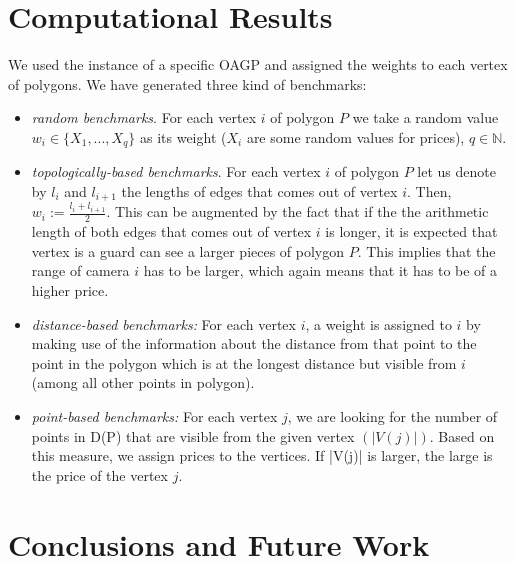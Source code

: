 \documentclass[runningheads,a4paper]{llncs}
\begin{document}
     \section{Computational Results}
       We used the instance of a specific OAGP and assigned the weights to each vertex of polygons. We have generated three kind of benchmarks:
       \begin{itemize}
       	  \item \emph{random benchmarks}. For each vertex $i$ of polygon $P$ we take a random value $w_i \in \{X_1,...,X_q\}$  as its weight ($X_i$ are some random values for prices), $q \in \mathbb{N}$.
       	  \item \emph{topologically-based benchmarks}. For each vertex $i$ of polygon $P$ let us denote by $l_i$ and $l_{i+1}$ the lengths of edges that comes out of vertex $i$. Then, $w_i := \frac{l_i + l_{i+1}}{2}$. This can be augmented by the fact that if the the arithmetic length of both edges that comes out of vertex $i$ is longer, it is expected that vertex is a guard can see a larger pieces of polygon $P$. This implies that the range of camera $i$ has to be larger, which again means that it has to be of a higher price.
       	 \item \emph{distance-based benchmarks:} For each vertex $i$, a weight is assigned to $i$ by making use of the information about the distance from that point to the point in the polygon which is at the longest distance but visible from $i$ (among all other points in polygon). 
       	 \item \emph{point-based benchmarks:} For each vertex $j$, we are looking for the number of points in D(P) that are visible from the given vertex $(|V(j)|)$. Based on this measure, we assign prices to the vertices. If |V(j)| is larger, the large is the price of the vertex $j$.
       \end{itemize}
     \section{Conclusions and Future Work}



    
    
\end{document}
